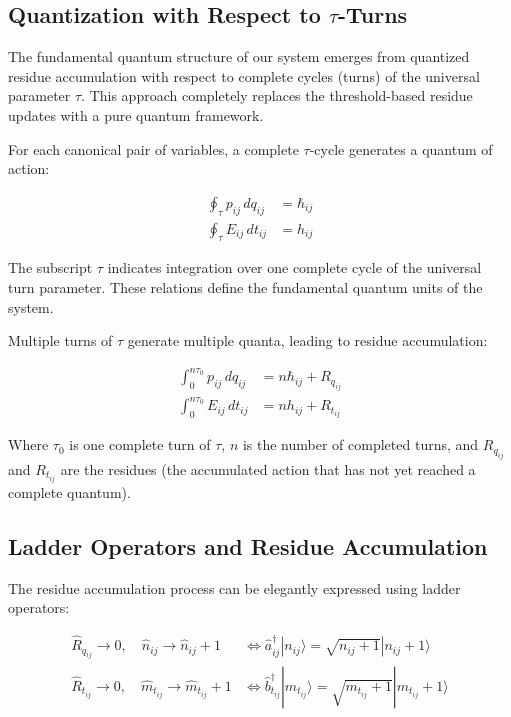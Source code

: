 \documentclass{article}
\begin{document}
\subsection{Quantization with Respect to $\tau$-Turns}

The fundamental quantum structure of our system emerges from quantized residue accumulation with respect to complete cycles (turns) of the universal parameter $\tau$. This approach completely replaces the threshold-based residue updates with a pure quantum framework.

For each canonical pair of variables, a complete $\tau$-cycle generates a quantum of action:

\begin{align}
\oint_\tau p_{ij} \, dq_{ij} &= \hbar_{ij} \\
\oint_\tau E_{ij} \, dt_{ij} &= h_{ij}
\end{align}

The subscript $\tau$ indicates integration over one complete cycle of the universal turn parameter. These relations define the fundamental quantum units of the system.

Multiple turns of $\tau$ generate multiple quanta, leading to residue accumulation:

\begin{align}
\int_{0}^{n\tau_0} p_{ij} \, dq_{ij} &= n \hbar_{ij} + R_{q_{ij}} \\
\int_{0}^{n\tau_0} E_{ij} \, dt_{ij} &= n h_{ij} + R_{t_{ij}}
\end{align}

Where $\tau_0$ is one complete turn of $\tau$, $n$ is the number of completed turns, and $R_{q_{ij}}$ and $R_{t_{ij}}$ are the residues (the accumulated action that has not yet reached a complete quantum).

\subsection{Ladder Operators and Residue Accumulation}

The residue accumulation process can be elegantly expressed using ladder operators:

\begin{align}
\hat{R}_{q_{ij}} \rightarrow 0, \quad \hat{n}_{ij} \rightarrow \hat{n}_{ij} + 1 &\Leftrightarrow \hat{a}_{ij}^\dagger |n_{ij}\rangle = \sqrt{n_{ij}+1} |n_{ij}+1\rangle \\
\hat{R}_{t_{ij}} \rightarrow 0, \quad \hat{m}_{t_{ij}} \rightarrow \hat{m}_{t_{ij}} + 1 &\Leftrightarrow \hat{b}_{t_{ij}}^\dagger |m_{t_{ij}}\rangle = \sqrt{m_{t_{ij}}+1} |m_{t_{ij}}+1\rangle
\end{align}
\end{document}
